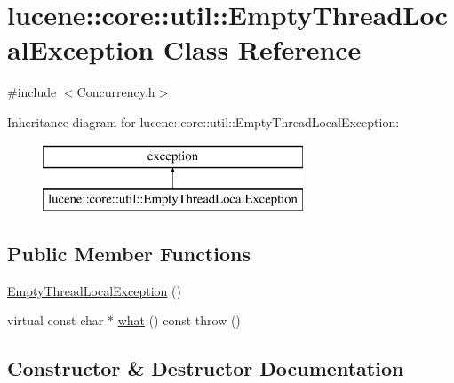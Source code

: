\hypertarget{classlucene_1_1core_1_1util_1_1EmptyThreadLocalException}{}\section{lucene\+:\+:core\+:\+:util\+:\+:Empty\+Thread\+Local\+Exception Class Reference}
\label{classlucene_1_1core_1_1util_1_1EmptyThreadLocalException}


{\ttfamily \#include $<$Concurrency.\+h$>$}

Inheritance diagram for lucene\+:\+:core\+:\+:util\+:\+:Empty\+Thread\+Local\+Exception\+:\begin{figure}[H]
\begin{center}
\leavevmode
\includegraphics[height=2.000000cm]{classlucene_1_1core_1_1util_1_1EmptyThreadLocalException}
\end{center}
\end{figure}
\subsection*{Public Member Functions}
\begin{DoxyCompactItemize}
\item 
\mbox{\hyperlink{classlucene_1_1core_1_1util_1_1EmptyThreadLocalException_a241a95d08b41259f7cb3c5d4a399b098}{Empty\+Thread\+Local\+Exception}} ()
\item 
virtual const char $\ast$ \mbox{\hyperlink{classlucene_1_1core_1_1util_1_1EmptyThreadLocalException_a33f16d7924d5b7b094c1af85ff8268ef}{what}} () const  throw ()
\end{DoxyCompactItemize}


\subsection{Constructor \& Destructor Documentation}
\mbox{\label{classlucene_1_1core_1_1util_1_1EmptyThreadLocalException_a241a95d08b41259f7cb3c5d4a399b098}} 
